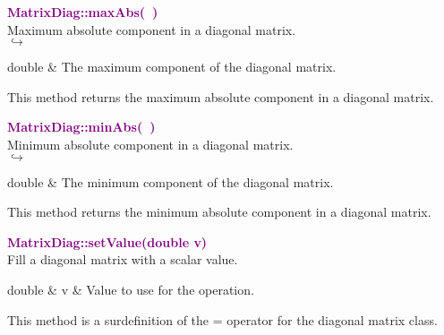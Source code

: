 \textcolor{purple}{\textbf{MatrixDiag::maxAbs(~)}}\label{MatrixDiag::maxAbs()}\\
Maximum absolute component in a diagonal matrix.\\ \hspace*{5mm}$\hookrightarrow$
\vspace*{-2em}\begin{tcolorbox}[grow to left by=-1cm, width=\textwidth-1cm,myArgs,tabularx={l|R}]
double & The maximum component of the diagonal matrix.
\end{tcolorbox}

This method returns the maximum absolute component in a diagonal matrix.

\textcolor{purple}{\textbf{MatrixDiag::minAbs(~)}}\label{MatrixDiag::minAbs()}\\
Minimum absolute component in a diagonal matrix.\\ \hspace*{5mm}$\hookrightarrow$
\vspace*{-2em}\begin{tcolorbox}[grow to left by=-1cm, width=\textwidth-1cm,myArgs,tabularx={l|R}]
double & The minimum component of the diagonal matrix.
\end{tcolorbox}

This method returns the minimum absolute component in a diagonal matrix.

\textcolor{purple}{\textbf{MatrixDiag::setValue(double v)}}\label{MatrixDiag::setValue(double v)}\\
Fill a diagonal matrix with a scalar value.

\begin{tcolorbox}[width=\textwidth,myArgs,tabularx={ll|R}]
double & v & Value to use for the operation.
\end{tcolorbox}

This method is a surdefinition of the = operator for the diagonal matrix class.

